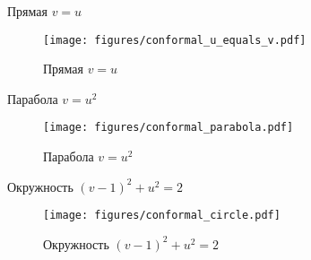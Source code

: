 \begin{frame}{Прямая \(v = u\)}
	\begin{figure}
		\centering
		\texttt{[image: figures/conformal\_u\_equals\_v.pdf]}
		\caption{Прямая \(v=u\)}\label{fig:conformal_u_equals_v}
	\end{figure}
\end{frame}

\begin{frame}{Парабола \(v = u^2\)}
	\begin{figure}
		\centering
		\texttt{[image: figures/conformal\_parabola.pdf]}
		\caption{Парабола \(v=u^2\)}\label{fig:conformal_parabola}
	\end{figure}
\end{frame}

\begin{frame}{Окружность \((v-1)^2 + u^2 = 2\)}
	\begin{figure}
		\centering
		\texttt{[image: figures/conformal\_circle.pdf]}
		\caption{Окружность \((v-1)^2 + u^2 = 2\)}\label{fig:conformal_circle}
	\end{figure}
\end{frame}
